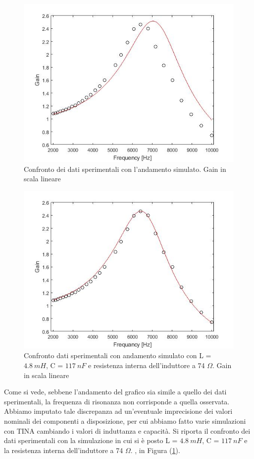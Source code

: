 \documentclass[journal, a4paper]{IEEEtran}
\begin{document}
\begin{figure}[htp]
\centering
\includegraphics[scale=.34]{graph1}
\caption{Confronto dei dati sperimentali con l'andamento simulato. Gain in scala lineare}
\end{figure}

\begin{figure}[htp]
\centering
\includegraphics[scale=.34]{graph4}
\caption{Confronto dati sperimentali con andamento simulato con L = $4.8~mH$, C = $117 ~nF$ e resistenza interna dell'induttore a 74 $\Omega$. Gain in scala lineare}
\label{last}
\end{figure}

Come si vede, sebbene l'andamento del grafico sia simile a quello dei dati sperimentali, la frequenza di risonanza non corrisponde a quella osservata. Abbiamo imputato tale discrepanza ad un'eventuale imprecisione dei valori nominali dei componenti a disposizione, per cui abbiamo fatto varie simulazioni con TINA cambiando i valori di induttanza e capacità. Si riporta il confronto dei dati sperimentali con la simulazione in cui si è posto L = $4.8~mH$, C = $117 ~nF$ e la resistenza interna dell'induttore a 74 $\Omega$.
, in Figura (\ref{last}).
\end{document}
